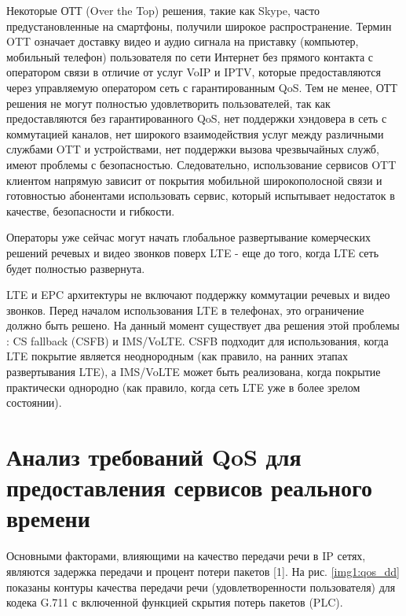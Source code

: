 Некоторые ОТТ (Over the Top) решения, такие как Skype, часто предустановленные на смартфоны, получили широкое распространение. Термин OTT означает доставку видео и аудио сигнала на приставку (компьютер, мобильный телефон) пользователя по сети Интернет без прямого контакта с оператором связи в отличие от услуг VoIP и IPTV, которые предоставляются через управляемую оператором сеть с гарантированным QoS. Тем не менее, ОТТ решения не могут полностью удовлетворить пользователей, так как предоставляются без гарантированного QoS, нет поддержки хэндовера в сеть с коммутацией каналов, нет широкого взаимодействия услуг между различными службами OTT и устройствами, нет поддержки вызова чрезвычайных служб, имеют проблемы с безопасностью. Следовательно, использование сервисов OTT клиентом напрямую зависит от покрытия мобильной широкополосной связи и готовностью абонентами использовать сервис, который испытывает недостаток в качестве, безопасности и гибкости. 

Операторы уже сейчас могут начать глобальное развертывание комерческих решений речевых и видео звонков поверх LTE - еще до того, когда LTE сеть будет полностью развернута.

LTE и EPC архитектуры не включают поддержку коммутации речевых и видео звонков. 
Перед началом использования LTE в телефонах, это ограничение должно быть решено. На данный момент существует два решения этой проблемы \cite{ericsson_backgrounder}: CS fallback (CSFB) и IMS/VoLTE. CSFB подходит для использования, когда LTE покрытие является неоднородным (как правило, на ранних этапах развертывания LTE), а IMS/VoLTE может быть реализована, когда покрытие практически однородно (как правило, когда сеть LTE уже в более зрелом состоянии).






\section{Анализ требований QoS для предоставления сервисов реального времени } \label{sect_qos}

Основными факторами,  влияющими на качество передачи речи в IP  сетях,  являются задержка передачи и процент потери пакетов [1].
На рис. \ref{img1:qos_dd} показаны контуры качества передачи речи (удовлетворенности пользователя) для кодека G.711 с включенной функцией скрытия потерь пакетов (PLC).


